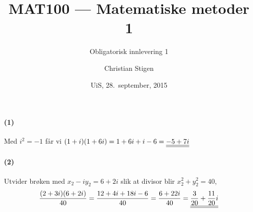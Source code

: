 \documentclass[a4paper,norsk,12pt]{article}
\title{MAT100 --- Matematiske metoder 1}
\subtitle{Obligatorisk innlevering 1}
\author{Christian Stigen}
\date{UiS, 28.~september, 2015}
\begin{document}
\maketitle


\paragraph{(1)}
Med $i^2 = -1$ får vi
\begin{math}
  (1+i)(1+6i) = 1+6i+i-6 = {\underline{\underline{-5+7i}}}
\end{math}

\paragraph{(2)}
Utvider brøken med $x_2 - iy_2 = 6 + 2i$ slik at divisor blir $x_2^2 +
y_2^2 = 40$,
\begin{equation*}
  \frac{(2+3i)(6+2i)}{40} = \frac{12+4i+18i-6}{40}
  = \frac{6+22i}{40} = {\underline{\underline{\frac{3}{20} + \frac{11}{20}i}}}
\end{equation*}


\end{document}
